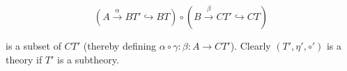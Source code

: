 $$\left( A \xrightarrow{\alpha} BT' \hookrightarrow BT \right) \circ \left( B \xrightarrow{\beta} CT' \hookrightarrow CT \right)$$

is a subset of $CT'$ (thereby defining $\alpha \circ \gamma: \beta: A \longrightarrow CT'$). Clearly $(T', \eta', \circ')$ is a theory if $T'$ is a subtheory.